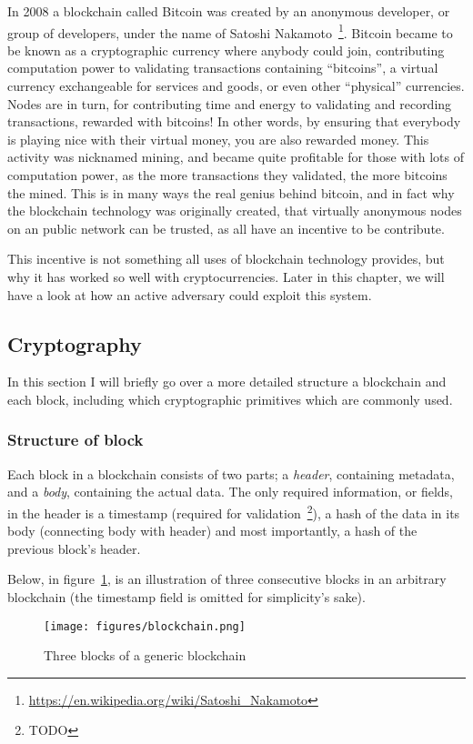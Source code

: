 In 2008 a blockchain called Bitcoin was created by an anonymous
developer, or group of developers, under the name of Satoshi
Nakamoto~\footnote{\url{https://en.wikipedia.org/wiki/Satoshi_Nakamoto}}.
Bitcoin became to be known as a cryptographic currency where anybody
could join, contributing computation power to validating transactions
containing ``bitcoins'', a virtual currency exchangeable for services
and goods, or even other ``physical'' currencies. Nodes are in turn,
for contributing time and energy to validating and recording
transactions, rewarded with bitcoins! In other words, by ensuring that
everybody is playing nice with their virtual money, you are also
rewarded money. This activity was nicknamed mining, and became quite
profitable for those with lots of computation power, as the more
transactions they validated, the more bitcoins the mined. This is in
many ways the real genius behind bitcoin, and in fact why the
blockchain technology was originally created, that virtually anonymous
nodes on an public network can be trusted, as all have an incentive to
be contribute.

This incentive is not something all uses of blockchain technology
provides, but why it has worked so well with cryptocurrencies. Later
in this chapter, we will have a look at how an active adversary could
exploit this system.


\subsection{Cryptography}
In this section I will briefly go over a more detailed structure a
blockchain and each block, including which cryptographic primitives
which are commonly used.

\subsubsection{Structure of block}
Each block in a blockchain consists of two parts; a \textit{header},
containing metadata, and a \textit{body}, containing the actual data.
The only required information, or fields, in the header is a
timestamp (required for validation~\footnote{TODO}), a hash of the data in
its body (connecting body with header) and most importantly, a hash of
the previous block's header.

Below, in figure~\ref{fig:blockchain}, is an illustration of three
consecutive blocks in an arbitrary blockchain (the timestamp field is
omitted for simplicity's sake).
\begin{figure}[H]
  \centering
  \texttt{[image: figures/blockchain.png]}
  \caption{\label{fig:blockchain} Three blocks of a generic blockchain}
\end{figure}


